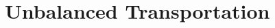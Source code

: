 \documentclass[11pt]{article}
\theoremstyle{plain}
\begin{document}
\section{Unbalanced Transportation}



{


}
\end{document}
